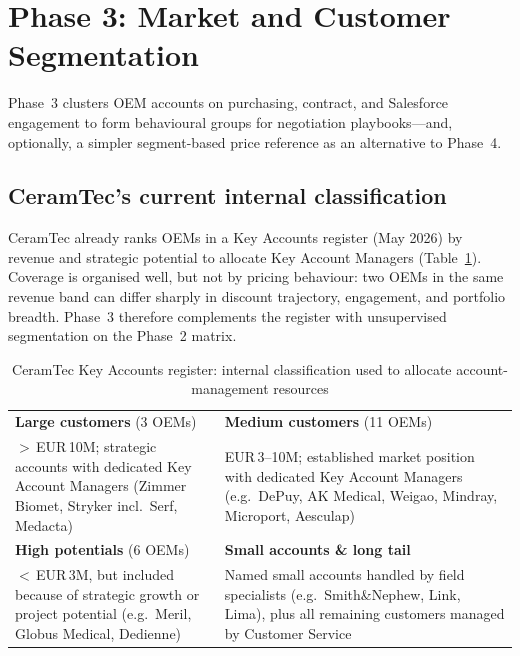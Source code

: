\documentclass{article}
\begin{document}
\clearpage

\section{Phase 3: Market and Customer Segmentation}
\label{sec:phase3}

Phase~3 clusters OEM accounts on purchasing, contract, and Salesforce engagement to form behavioural groups for negotiation playbooks---and, optionally, a simpler segment-based price reference as an alternative to Phase~4.

\subsection{CeramTec's current internal classification}
\label{sec:internal-classification}

CeramTec already ranks OEMs in a Key Accounts register (May 2026) by revenue and strategic potential to allocate Key Account Managers (Table~\ref{tab:internal_tiers}). Coverage is organised well, but not by pricing behaviour: two OEMs in the same revenue band can differ sharply in discount trajectory, engagement, and portfolio breadth. Phase~3 therefore complements the register with unsupervised segmentation on the Phase~2 matrix.

\begin{table}[H]
\centering
\small
\begin{tabular}{@{}p{7.2cm}p{7.2cm}@{}}
\toprule
\textbf{Large customers} (3 OEMs) &
\textbf{Medium customers} (11 OEMs) \\
$>$\,EUR\,10M; strategic accounts with dedicated Key Account Managers (Zimmer Biomet, Stryker incl.\ Serf, Medacta) &
EUR\,3--10M; established market position with dedicated Key Account Managers (e.g.\ DePuy, AK Medical, Weigao, Mindray, Microport, Aesculap) \\
\midrule
\textbf{High potentials} (6 OEMs) &
\textbf{Small accounts \& long tail} \\
$<$\,EUR\,3M, but included because of strategic growth or project potential (e.g.\ Meril, Globus Medical, Dedienne) &
Named small accounts handled by field specialists (e.g.\ Smith\&Nephew, Link, Lima), plus all remaining customers managed by Customer Service \\
\bottomrule
\end{tabular}
\caption{CeramTec Key Accounts register: internal classification used to allocate account-management resources}
\label{tab:internal_tiers}
\end{table}
\end{document}
